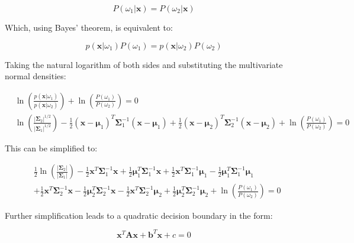 \documentclass[12pt]{article}
\begin{document}
\begin{equation}
P(\omega_1 | \mathbf{x}) = P(\omega_2 | \mathbf{x})
\end{equation}

Which, using Bayes' theorem, is equivalent to:

\begin{equation}
p(\mathbf{x} | \omega_1) P(\omega_1) = p(\mathbf{x} | \omega_2) P(\omega_2)
\end{equation}

Taking the natural logarithm of both sides and substituting the multivariate normal densities:

\begin{align}
&\ln\left(\frac{p(\mathbf{x} | \omega_1)}{p(\mathbf{x} | \omega_2)}\right) + \ln\left(\frac{P(\omega_1)}{P(\omega_2)}\right) = 0 \\
&\ln\left(\frac{|\boldsymbol{\Sigma}_2|^{1/2}}{|\boldsymbol{\Sigma}_1|^{1/2}}\right) - \frac{1}{2}(\mathbf{x} - \boldsymbol{\mu}_1)^T \boldsymbol{\Sigma}_1^{-1} (\mathbf{x} - \boldsymbol{\mu}_1) + \frac{1}{2}(\mathbf{x} - \boldsymbol{\mu}_2)^T \boldsymbol{\Sigma}_2^{-1} (\mathbf{x} - \boldsymbol{\mu}_2) + \ln\left(\frac{P(\omega_1)}{P(\omega_2)}\right) = 0
\end{align}

This can be simplified to:

\begin{align}
&\frac{1}{2}\ln\left(\frac{|\boldsymbol{\Sigma}_2|}{|\boldsymbol{\Sigma}_1|}\right) - \frac{1}{2}\mathbf{x}^T\boldsymbol{\Sigma}_1^{-1}\mathbf{x} + \frac{1}{2}\boldsymbol{\mu}_1^T\boldsymbol{\Sigma}_1^{-1}\mathbf{x} + \frac{1}{2}\mathbf{x}^T\boldsymbol{\Sigma}_1^{-1}\boldsymbol{\mu}_1 - \frac{1}{2}\boldsymbol{\mu}_1^T\boldsymbol{\Sigma}_1^{-1}\boldsymbol{\mu}_1 \\
&+ \frac{1}{2}\mathbf{x}^T\boldsymbol{\Sigma}_2^{-1}\mathbf{x} - \frac{1}{2}\boldsymbol{\mu}_2^T\boldsymbol{\Sigma}_2^{-1}\mathbf{x} - \frac{1}{2}\mathbf{x}^T\boldsymbol{\Sigma}_2^{-1}\boldsymbol{\mu}_2 + \frac{1}{2}\boldsymbol{\mu}_2^T\boldsymbol{\Sigma}_2^{-1}\boldsymbol{\mu}_2 + \ln\left(\frac{P(\omega_1)}{P(\omega_2)}\right) = 0
\end{align}

Further simplification leads to a quadratic decision boundary in the form:

\begin{equation}
\mathbf{x}^T \mathbf{A} \mathbf{x} + \mathbf{b}^T \mathbf{x} + c = 0
\end{equation}
\end{document}
